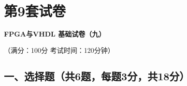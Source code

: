 \chapter{第9套试卷}

\begin{center}
\textbf{FPGA与VHDL 基础试卷（九）}

（满分：100分 \hspace{2em} 考试时间：120分钟）
\end{center}

\section*{一、选择题（共6题，每题3分，共18分）}

